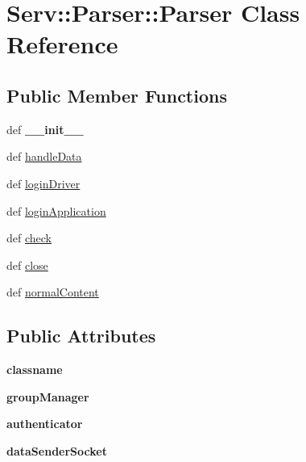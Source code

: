 \hypertarget{class_serv_1_1_parser_1_1_parser}{
\section{Serv::Parser::Parser Class Reference}
\label{class_serv_1_1_parser_1_1_parser}
}
\subsection*{Public Member Functions}
\begin{CompactItemize}
\item 
\hypertarget{class_serv_1_1_parser_1_1_parser_8627f07c762983eff029ad167a021e38}{
def \textbf{\_\-\_\-init\_\-\_\-}}
\label{class_serv_1_1_parser_1_1_parser_8627f07c762983eff029ad167a021e38}

\item 
def \hyperlink{class_serv_1_1_parser_1_1_parser_060ed5ba3cbf55b63ecc3f3aa006da04}{handleData}
\item 
def \hyperlink{class_serv_1_1_parser_1_1_parser_e092cef5abd35ec04fa61e71377e1303}{loginDriver}
\item 
def \hyperlink{class_serv_1_1_parser_1_1_parser_ec3286787a7c8642127416c77e1c2c8f}{loginApplication}
\item 
def \hyperlink{class_serv_1_1_parser_1_1_parser_93e284233267c2db61d20d9239fed4c8}{check}
\item 
def \hyperlink{class_serv_1_1_parser_1_1_parser_b6aa6195abf7a68df644640a8e4fd263}{close}
\item 
def \hyperlink{class_serv_1_1_parser_1_1_parser_dc1da4d6ff7eb9dbc114f8a426274aa0}{normalContent}
\end{CompactItemize}
\subsection*{Public Attributes}
\begin{CompactItemize}
\item 
\hypertarget{class_serv_1_1_parser_1_1_parser_98309dc29b98b9dbbaba8175bc6fce00}{
\textbf{classname}}
\label{class_serv_1_1_parser_1_1_parser_98309dc29b98b9dbbaba8175bc6fce00}

\item 
\hypertarget{class_serv_1_1_parser_1_1_parser_8e8fc28fb138a84f24593294eba5a237}{
\textbf{groupManager}}
\label{class_serv_1_1_parser_1_1_parser_8e8fc28fb138a84f24593294eba5a237}

\item 
\hypertarget{class_serv_1_1_parser_1_1_parser_59f3263667252c32bbe04baf2db0c12e}{
\textbf{authenticator}}
\label{class_serv_1_1_parser_1_1_parser_59f3263667252c32bbe04baf2db0c12e}

\item 
\hypertarget{class_serv_1_1_parser_1_1_parser_db376d9d8d99afa93fa43b3ca8153e9f}{
\textbf{dataSenderSocket}}
\label{class_serv_1_1_parser_1_1_parser_db376d9d8d99afa93fa43b3ca8153e9f}

\end{CompactItemize}


